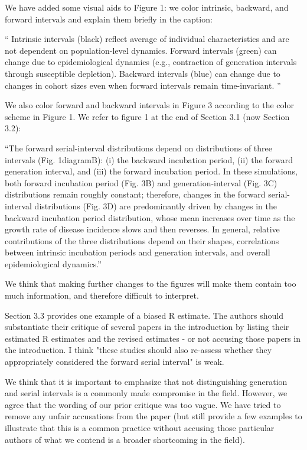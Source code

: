 \documentclass[12pt]{article}
\newcommand{\revtext}{\textsf}
\begin{document}
We have added some visual aids to Figure 1: we color intrinsic, backward, and forward intervals and explain them briefly in the caption:

``
Intrinsic intervals (black) reflect average of individual characteristics and are not dependent on population-level dynamics.
  Forward intervals (green) can change due to epidemiological dynamics (e.g., contraction of generation intervals through susceptible depletion).
  Backward intervals (blue) can change due to changes in cohort sizes even when forward intervals remain time-invariant.
''

We also color forward and backward intervals in Figure 3 according to the color scheme in Figure 1.
We refer to figure 1 at the end of Section 3.1 (now Section 3.2):

``The forward serial-interval distributions depend on distributions of three intervals
(Fig. 1{diagram}B): (i) the backward incubation period, (ii) the forward generation interval, and (iii) the forward incubation period.
In these simulations, both forward incubation period (Fig. 3B) and generation-interval (Fig. 3C) distributions remain roughly constant;
therefore, changes in the forward serial-interval distributions (Fig. 3D) are predominantly driven by changes in the backward incubation period distribution, whose mean increases over time as the growth rate of disease incidence slows and then reverses.
In general, relative contributions of the three distributions depend on their shapes, correlations between intrinsic incubation periods and generation intervals, and overall epidemiological dynamics.''

We think that making further changes to the figures will make them contain too much information, and therefore difficult to interpret.

\revtext{Section 3.3 provides one example of a biased R estimate. The authors should substantiate their critique of several papers in the introduction by listing their estimated R estimates and the revised estimates - or not accusing those papers in the introduction. I think "these studies should also re-assess whether they appropriately considered the forward serial interval" is weak.}

We think that it is important to emphasize that not distinguishing generation and serial intervals is a commonly made compromise in the field. 
However, we agree that the wording of our prior critique was too vague.
We have tried to remove any unfair accusations from the paper (but still provide a few examples to illustrate that this is a common practice without accusing those particular authors of what we contend is a broader shortcoming in the field).
\end{document}

